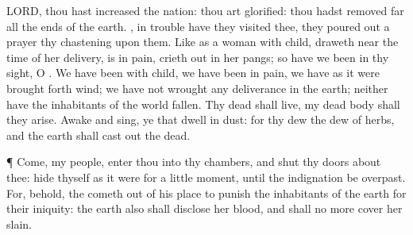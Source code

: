 {{{LORD}}, thou hast
increased the
nation: thou art
glorified: thou hadst removed
{}
far
{} all the
ends of the
earth.
, in
trouble have they
visited thee, they poured
out a
prayer
{} thy
chastening
{} upon them.
Like as a woman with
child,
{} draweth
near the time of her
delivery, is in
pain,
{} crieth
out in her
pangs; so have we been in thy
sight, O
{}.
We have been with
child, we have been in
pain, we have as it
were brought
forth
wind; we have not
wrought any
deliverance in the
earth;
neither have the
inhabitants of the
world
fallen.
Thy
dead
{} shall
live,
{} my dead
body shall they
arise.
Awake and
sing, ye that
dwell in
dust: for thy
dew
{} the
dew of
herbs, and the
earth shall cast
out the
dead.
\par }{\PP {}¶
Come, my
people,
enter thou into thy
chambers, and
shut thy
doors about thee:
hide thyself as it were for a
little
moment, until the
indignation be
overpast.
For, behold, the
{} cometh
out of his
place to
punish the
inhabitants of the
earth for their
iniquity: the
earth also shall
disclose her
blood, and shall no more
cover her
slain.

}
